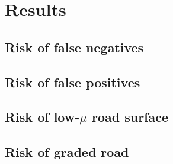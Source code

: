 \section{Results}
\label{sec:results}




\subsection{Risk of false negatives}
\label{sec:results false negatives}



\subsection{Risk of false positives}
\label{sec:results false positives}



\subsection{Risk of low-$\mu$ road surface}
\label{sec:results low mu}



\subsection{Risk of graded road}
\label{sec:results slope}
